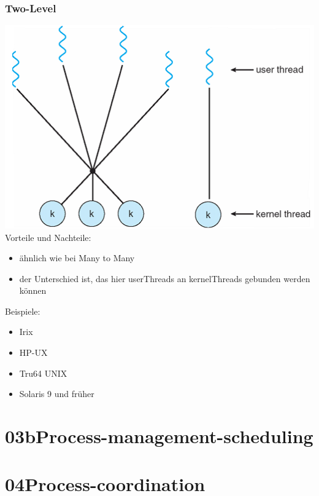 \documentclass[a4paper]{scrreprt}
\begin{document}
	\subsection{Two-Level}
		\includegraphics[scale = 0.6]{graphics/two_level_model.png}
		Vorteile und Nachteile:
		\begin{itemize}
			\item ähnlich wie bei Many to Many
			\item der Unterschied ist, das hier userThreads an kernelThreads gebunden werden können
		\end{itemize}
		Beispiele:
		\begin{itemize}
			\item Irix
			\item HP-UX
			\item Tru64 UNIX
			\item Solaris 9 und früher
		\end{itemize}
\chapter{03bProcess-management-scheduling}
\chapter{04Process-coordination}
\end{document}
